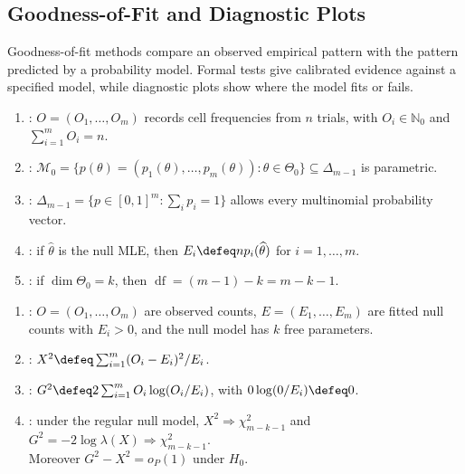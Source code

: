 \subsection{Goodness-of-Fit and Diagnostic Plots}

Goodness-of-fit methods compare an observed empirical pattern with the pattern predicted by a probability model.  Formal tests give calibrated evidence against a specified model, while diagnostic plots show where the model fits or fails.

\begin{definition} \label{def:multinomial-goodness-of-fit-model} 
\begin{enumerate}[label=(\roman*)]
\setlength{\itemsep}{0pt}
\item {}: $O=(O_1,\ldots,O_m)$ records cell frequencies from $n$ trials, with $O_i\in\mathbb{N}_0$ and $\sum_{i=1}^mO_i=n$.
\item {}: $\mathcal{M}_0=\{p(\theta)=(p_1(\theta),\ldots,p_m(\theta)):\theta\in\Theta_0\}\subseteq\Delta_{m-1}$ is parametric.
\item {}: $\Delta_{m-1}=\{p\in[0,1]^m:\sum_i p_i=1\}$ allows every multinomial probability vector.
\item {}: if $\widehat{\theta}$ is the null MLE, then $E_i\defeq np_i(\widehat{\theta})$ for $i=1,\ldots,m$.
\item {}: if $\dim\Theta_0=k$, then $\operatorname{df}=(m-1)-k=m-k-1$.
\end{enumerate}
\end{definition}

\begin{definition} \label{def:pearson-and-likelihood-ratio-gof-statistics} 
\begin{enumerate}[label=(\roman*)]
\setlength{\itemsep}{0pt}
\item {}: $O=(O_1,\ldots,O_m)$ are observed counts, $E=(E_1,\ldots,E_m)$ are fitted null counts with $E_i>0$, and the null model has $k$ free parameters.
\item {}: $X^2\defeq\sum_{i=1}^m(O_i-E_i)^2/E_i$.
\item {}: $G^2\defeq2\sum_{i=1}^mO_i\log(O_i/E_i)$, with $0\log(0/E_i)\defeq0$.
\item {}: under the regular null model, $X^2\Rightarrow\chi^2_{m-k-1}$ and $G^2=-2\log\lambda(X)\Rightarrow\chi^2_{m-k-1}$.\\
Moreover $G^2-X^2=o_{P}(1)$ under $H_0$.
\end{enumerate}
\end{definition}


